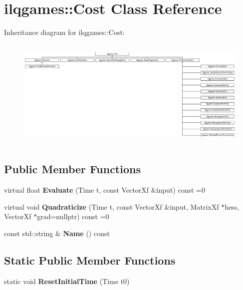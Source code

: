 \hypertarget{classilqgames_1_1_cost}{}\section{ilqgames\+:\+:Cost Class Reference}
\label{classilqgames_1_1_cost}
Inheritance diagram for ilqgames\+:\+:Cost\+:\begin{figure}[H]
\begin{center}
\leavevmode
\includegraphics[height=5.333333cm]{classilqgames_1_1_cost}
\end{center}
\end{figure}
\subsection*{Public Member Functions}
\begin{DoxyCompactItemize}
\item 
virtual float {\bfseries Evaluate} (Time t, const Vector\+Xf \&input) const =0\hypertarget{classilqgames_1_1_cost_a90ad7fc2697f0d8c3392dc5a079e40f9}{}\label{classilqgames_1_1_cost_a90ad7fc2697f0d8c3392dc5a079e40f9}

\item 
virtual void {\bfseries Quadraticize} (Time t, const Vector\+Xf \&input, Matrix\+Xf $\ast$hess, Vector\+Xf $\ast$grad=nullptr) const =0\hypertarget{classilqgames_1_1_cost_ade89b117df8b8ec0e491d121f9682aef}{}\label{classilqgames_1_1_cost_ade89b117df8b8ec0e491d121f9682aef}

\item 
const std\+::string \& {\bfseries Name} () const \hypertarget{classilqgames_1_1_cost_a7e21af3d7f23aee0d913ad5e2e0292cb}{}\label{classilqgames_1_1_cost_a7e21af3d7f23aee0d913ad5e2e0292cb}

\end{DoxyCompactItemize}
\subsection*{Static Public Member Functions}
\begin{DoxyCompactItemize}
\item 
static void {\bfseries Reset\+Initial\+Time} (Time t0)\hypertarget{classilqgames_1_1_cost_a3ac607a91844c85761467f08326245e5}{}\label{classilqgames_1_1_cost_a3ac607a91844c85761467f08326245e5}

\end{DoxyCompactItemize}
